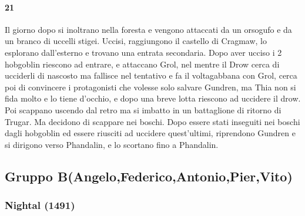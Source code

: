\documentclass{article}
\begin{document}
          \paragraph{21}  
            Il giorno dopo si inoltrano nella foresta e vengono attaccati da un orsogufo e da un branco di uccelli stigei. Uccisi, raggiungono il castello di Cragmaw, lo esplorano dall'esterno e trovano una entrata secondaria. Dopo aver ucciso i 2 hobgoblin riescono ad entrare, e attaccano Grol, nel mentre il Drow cerca di ucciderli di nascosto ma fallisce nel tentativo e fa il voltagabbana con Grol, cerca poi di convincere i protagonisti che volesse solo salvare Gundren, ma Thia non si fida molto e lo tiene d'occhio, e dopo una breve lotta riescono ad uccidere il drow. Poi scappano uscendo dal retro ma si imbatto in un battaglione di ritorno di Trugar. Ma decidono di scappare nei boschi. 
            Dopo essere stati inseguiti nei boschi dagli hobgoblin ed essere riusciti ad uccidere quest'ultimi, riprendono Gundren e si dirigono verso Phandalin, e lo scortano fino a Phandalin. 
            \subsection{Gruppo B(Angelo,Federico,Antonio,Pier,Vito)}
              \subsubsection{Nightal (1491)}
\end{document}
